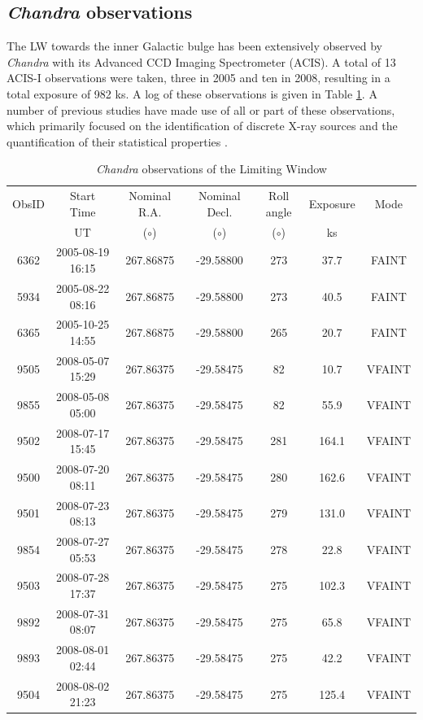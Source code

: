 \documentclass[fleqn,usenatbib]{mnras}
\begin{document}
\subsection{{\it Chandra} observations} \label{subsec:xdata}
The LW towards the inner Galactic bulge has been extensively observed by {\it Chandra} with its Advanced CCD Imaging Spectrometer (ACIS).
A total of 13 ACIS-I observations were taken, three in 2005 and ten in 2008, resulting in a total exposure of 982 ks.
A log of these observations is given in Table \ref{tab:obsinfo}. 
A number of previous studies have made use of all or part of these observations, which primarily focused on the identification of discrete X-ray sources and the quantification of their statistical properties \citep{2009Natur.458.1142R,2009ApJ...700.1702V,2009ApJ...706..223H,2011MNRAS.414..495R,2012MNRAS.427.1633H,2013ApJ...766...14M,2016MNRAS.462L.106W}.

\begin{table}
\centering
\caption{{\it Chandra} observations of the Limiting Window} \label{tab:obsinfo}
\centering
\begin{tabular}{ccccccc}
\hline
\hline
ObsID & Start Time & Nominal R.A. & Nominal Decl. &  Roll angle & Exposure & Mode\\
& UT & ($\circ$) & ($\circ$) & ($\circ$) & ks & \\ 
\hline
6362 & 2005-08-19 16:15 & 267.86875 & -29.58800 & 273 & 37.7 & FAINT \\
5934 & 2005-08-22 08:16 & 267.86875 & -29.58800 & 273 & 40.5 & FAINT \\
6365 & 2005-10-25 14:55 & 267.86875 & -29.58800 & 265 & 20.7 & FAINT \\
9505 & 2008-05-07 15:29 & 267.86375 & -29.58475 & 82  & 10.7 & VFAINT \\
9855 & 2008-05-08 05:00 & 267.86375 & -29.58475 & 82  & 55.9 & VFAINT \\
9502 & 2008-07-17 15:45 & 267.86375 & -29.58475 & 281 & 164.1 & VFAINT \\
9500 & 2008-07-20 08:11 & 267.86375 & -29.58475 & 280 & 162.6 & VFAINT \\
9501 & 2008-07-23 08:13 & 267.86375 & -29.58475 & 279 & 131.0 & VFAINT \\
9854 & 2008-07-27 05:53 & 267.86375 & -29.58475 & 278 & 22.8 & VFAINT \\
9503 & 2008-07-28 17:37 & 267.86375 & -29.58475 & 275 & 102.3 & VFAINT \\
9892 & 2008-07-31 08:07 & 267.86375 & -29.58475 & 275 & 65.8 & VFAINT \\
9893 & 2008-08-01 02:44 & 267.86375 & -29.58475 & 275 & 42.2 & VFAINT \\
9504 & 2008-08-02 21:23 & 267.86375 & -29.58475 & 275 & 125.4 & VFAINT \\
\hline
\end{tabular}
\end{table}
\end{document}
